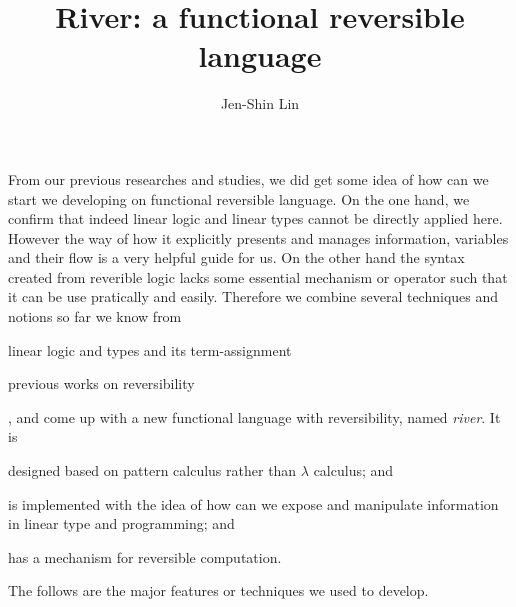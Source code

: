 \documentclass[a4paper]{article}
\title{River: a functional reversible language}
\author{Jen-Shin Lin}
\begin{document}
\maketitle

From our previous researches and studies, we did get some idea of how can we start we developing on functional reversible language. On the one hand, we confirm that indeed linear logic and linear types cannot be directly applied here. However the way of how it explicitly presents and manages information, variables and their flow is a very helpful guide for us. On the other hand the syntax created from reverible logic lacks some essential mechanism or operator such that it can be use pratically and easily. Therefore we combine several techniques and notions so far we know from
\begin{sublist}
\item linear logic and types and its term-assignment \cite{Benton92, Wadler93, Benton93, Ronchi94, Girard95, Turner98, Novitzka07}
\item previous works on reversibility \cite{Yokoyama11, Sparks14, Brown16, Yokoyama16}
\end{sublist}
, and come up with a new functional language with reversibility, named \textit{river}. It is
\begin{sublist}
\item{designed based on pattern calculus rather than $\lambda$ calculus; and}
\item{is implemented with the idea of how can we expose and manipulate information in linear type and programming; and}
\item{has a mechanism for reversible computation}.
\end{sublist}
The follows are the major features or techniques we used to develop.
\end{document}
